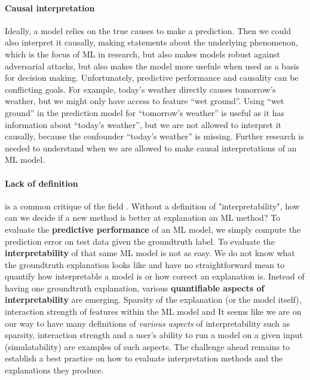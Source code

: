 \documentclass[runningheads]{llncs}
\begin{document}
\paragraph{Causal interpretation}
Ideally, a model relies on the true causes to make a prediction.
Then we could also interpret it causally, making statements about the underlying phenomenon, which is the focus of ML in research, but also makes models robust against adversarial attacks, but also makes the model more usefule when used as a basis for decision making.
Unfortunately, predictive performance and causality can be conflicting goals.
For example, today's weather directly causes tomorrow's weather, but we might only have access to feature \enquote{wet ground}.
Using \enquote{wet ground} in the prediction model for \enquote{tomorrow's weather} is useful as it has information about \enquote{today's weather}, but we are not allowed to interpret it causally, because the confounder \enquote{today's weather} is missing.
Further research is needed to understand when we are allowed to make causal interpretations of an ML model.

\paragraph{Lack of definition} is a common critique of the field \cite{lipton2018mythos,doshi2017towards}.
Without a definition of "interpretability", how can we decide if a new method is better at explanation an ML method?
To evaluate the \textbf{predictive performance} of an ML model, we simply compute the prediction error on test data given the groundtruth label.
To evaluate the \textbf{interpretability} of that same ML model is not as easy.
We do not know what the groundtruth explanation looks like and have no straightforward mean to quantify how interpretable a model is or how correct an explanation is.
Instead of having one groundtruth explanation, various \textbf{quantifiable aspects of interpretability} are emerging.\cite{poursabzi2018manipulating,philipp2018measuring,molnar2019quantifying,hauenstein2018computing,zhou2018measuring,akaike1998information,schwarz1978estimating,poursabzi2018manipulating,dhurandhar2017tip,friedler2019assessing}
Sparsity of the explanation (or the model itself), interaction strength of features within the ML model and
It seems like we are on our way to have many definitions of \textit{various aspects} of interpretability such as sparsity, interaction strength and a user's ability to run a model on a given input (simulatability) are examples of such aspects.
The challenge ahead remains to establish a best practice on how to evaluate interpretation methods and the explanations they produce.
\end{document}
